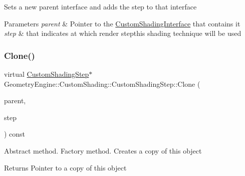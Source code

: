 Sets a new parent interface and adds the step to that interface 
\begin{DoxyParams}{Parameters}
{\em parent} & Pointer to the \mbox{\hyperlink{class_geometry_engine_1_1_custom_shading_1_1_custom_shading_interface}{Custom\+Shading\+Interface}} that contains it \\
\hline
{\em step} & that indicates at which render stepthis shading technique will be used \\
\hline
\end{DoxyParams}
\mbox{\label{class_geometry_engine_1_1_custom_shading_1_1_custom_shading_step_aa9279c195d3a8f294860a431508675c3}} 
\subsubsection{\texorpdfstring{Clone()}{Clone()}}
{\footnotesize\ttfamily virtual \mbox{\hyperlink{class_geometry_engine_1_1_custom_shading_1_1_custom_shading_step}{Custom\+Shading\+Step}}$\ast$ Geometry\+Engine\+::\+Custom\+Shading\+::\+Custom\+Shading\+Step\+::\+Clone (\begin{DoxyParamCaption}\item[{\mbox{\hyperlink{class_geometry_engine_1_1_custom_shading_1_1_custom_shading_interface}{Custom\+Shading\+Interface}} $\ast$}]{parent,  }\item[{\mbox{\hyperlink{namespace_geometry_engine_1_1_custom_shading_a2dc236a5b567da5099069ce2b2be5609}{Custom\+Shading\+Steps}}}]{step }\end{DoxyParamCaption}) const\hspace{0.3cm}{\ttfamily [pure virtual]}}

Abstract method. Factory method. Creates a copy of this object \begin{DoxyReturn}{Returns}
Pointer to a copy of this object 
\end{DoxyReturn}


